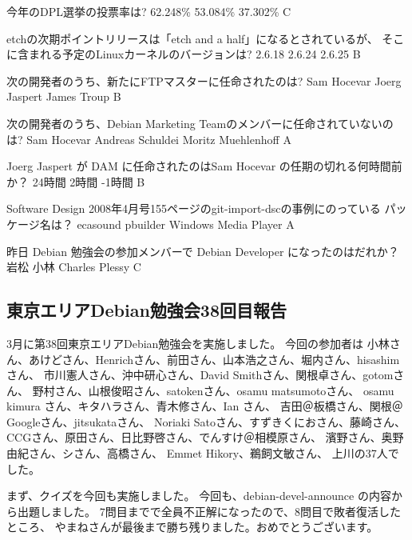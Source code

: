 \documentclass[mingoth,a4paper]{jsarticle}
\begin{document}
\begin{multicols}{2}
 \santaku
 {今年のDPL選挙の投票率は?}
 {62.248\%{}}%
 {53.084\%{}}%
 {37.302\%{}}%
 {C}
 
 \santaku
 {etchの次期ポイントリリースは「etch and a half」になるとされているが、
 そこに含まれる予定のLinuxカーネルのバージョンは?}
 {2.6.18}
 {2.6.24}
 {2.6.25}
 {B}
 
 \santaku
 {次の開発者のうち、新たにFTPマスターに任命されたのは?}
 {Sam Hocevar}
 {Joerg Jaspert}
 {James Troup}
 {B}
 
 \santaku
 {次の開発者のうち、Debian Marketing Teamのメンバーに任命されていないのは?}
 {Sam Hocevar}
 {Andreas Schuldei}
 {Moritz Muehlenhoff}
 {A}

 \santaku
 {Joerg Jaspert が DAM に任命されたのはSam Hocevar の任期の切れる何時間前か？}
 {24時間}
 {2時間}
 {-1時間}
 {B}

 \santaku
 {Software Design 2008年4月号155ページのgit-import-dscの事例にのっている
 パッケージ名は？}
 {ecasound}
 {pbuilder}
 {Windows Media Player}
 {A}

 \santaku
 {昨日 Debian 勉強会の参加メンバーで Debian Developer になったのはだれか？}
 {岩松}
 {小林}
 {Charles Plessy}
 {C}

\end{multicols}

\subsection{東京エリアDebian勉強会38回目報告}


3月に第38回東京エリアDebian勉強会を実施しました。
今回の参加者は
小林さん、あけどさん、Henrichさん、前田さん、山本浩之さん、堀内さん、hisashimさん、
市川憲人さん、沖中研心さん、David Smithさん、関根卓さん、gotomさん、
野村さん、山根俊昭さん、satokenさん、osamu matsumotoさん、
osamu kimura さん、キタハラさん、青木修さん、Ian さん、
吉田＠板橋さん、関根＠Googleさん、jitsukataさん、
Noriaki Satoさん、すずきくにおさん、藤崎さん、
CCGさん、原田さん、日比野啓さん、でんすけ＠相模原さん、
濱野さん、奥野由紀さん、シさん、高橋さん、
Emmet Hikory、鵜飼文敏さん、
上川の37人でした。

まず、クイズを今回も実施しました。
今回も、debian-devel-announce の内容から出題しました。
7問目までで全員不正解になったので、8問目で敗者復活したところ、
やまねさんが最後まで勝ち残りました。おめでとうございます。
\end{document}
